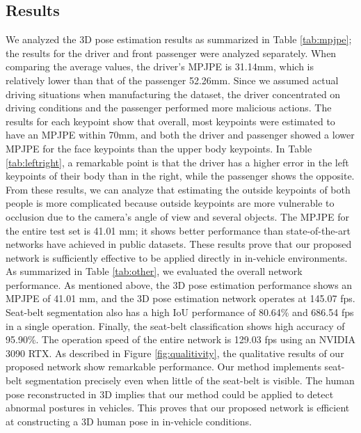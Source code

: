 \documentclass[letterpaper]{article} %
\begin{document}
\subsection{Results}
We analyzed the 3D pose estimation results as summarized in Table \ref{tab:mpjpe}; the results for the driver and front passenger were analyzed separately. When comparing the average values, the driver's MPJPE is 31.14mm, which is relatively lower than that of the passenger 52.26mm. Since we assumed actual driving situations when manufacturing the dataset, the driver concentrated on driving conditions and the passenger performed more malicious actions. The results for each keypoint show that overall, most keypoints were estimated to have an MPJPE within 70mm, and both the driver and passenger showed a lower MPJPE for the face keypoints than the upper body keypoints. In Table \ref{tab:leftright}, a remarkable point is that the driver has a higher error in the left keypoints of their body than in the right, while the passenger shows the opposite. From these results, we can analyze that estimating the outside keypoints of both people is more complicated because outside keypoints are more vulnerable to occlusion due to the camera's angle of view and several objects. The MPJPE for the entire test set is 41.01 mm; it shows better performance than state-of-the-art networks have achieved in public datasets. These results prove that our proposed network is sufficiently effective to be applied directly in in-vehicle environments.  As summarized in Table \ref{tab:other}, we evaluated the overall network performance. As mentioned above, the 3D pose estimation performance shows an MPJPE of 41.01 mm, and the 3D pose estimation network operates at 145.07 fps. Seat-belt segmentation also has a high IoU performance of 80.64\% and 686.54 fps in a single operation. Finally, the seat-belt classification shows high accuracy of 95.90\%. The operation speed of the entire network is 129.03 fps using an NVIDIA 3090 RTX. As described in Figure \ref{fig:qualitivity}, the qualitative results of our proposed network show remarkable performance. Our method implements seat-belt segmentation precisely even when little of the seat-belt is visible. The human pose reconstructed in 3D implies that our method could be applied to detect abnormal postures in vehicles. This proves that our proposed network is efficient at constructing a 3D human pose in in-vehicle conditions.
\end{document}
